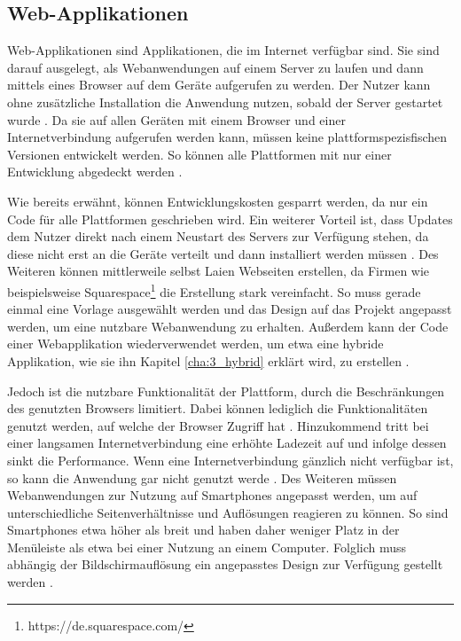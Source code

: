 \subsection{Web-Applikationen}
\label{cha:3_2_web}
Web-Applikationen sind Applikationen, die im Internet verfügbar sind. Sie sind darauf ausgelegt, als Webanwendungen auf einem Server zu laufen und dann mittels eines Browser auf dem Geräte aufgerufen zu werden. Der Nutzer kann ohne zusätzliche Installation die Anwendung nutzen, sobald der Server gestartet wurde \cite{IEEE_Khackouch_Al}.
Da sie auf allen Geräten mit einem Browser und einer Internetverbindung aufgerufen werden kann, müssen keine plattformspezisfischen Versionen entwickelt werden.
So können alle Plattformen mit nur einer Entwicklung abgedeckt werden \cite{IEEE_development_classes}.

Wie bereits erwähnt, können Entwicklungskosten gesparrt werden, da nur ein Code für alle Plattformen geschrieben wird. Ein weiterer Vorteil ist, dass Updates dem Nutzer direkt nach einem Neustart des Servers zur Verfügung stehen, da diese nicht erst an die Geräte verteilt und dann installiert werden müssen \cite{IEEE_Khackouch_Al}. Des Weiteren können mittlerweile selbst Laien Webseiten erstellen, da Firmen wie beispielsweise Squarespace\footnote{https://de.squarespace.com/} die Erstellung stark vereinfacht. So muss gerade einmal eine Vorlage ausgewählt werden und das Design auf das Projekt angepasst werden, um eine nutzbare Webanwendung zu erhalten. 
Außerdem kann der Code einer Webapplikation wiederverwendet werden, um etwa eine hybride Applikation, wie sie ihn Kapitel \ref{cha:3_hybrid} erklärt wird, zu erstellen \cite{IEEE_Khackouch_Al}. 

Jedoch ist die nutzbare Funktionalität der Plattform, durch die Beschränkungen des genutzten Browsers limitiert. Dabei können lediglich die Funktionalitäten genutzt werden, auf welche der Browser Zugriff hat \cite{Phyo}. Hinzukommend tritt bei einer langsamen Internetverbindung eine erhöhte Ladezeit auf und infolge dessen sinkt die Performance. Wenn eine Internetverbindung gänzlich nicht verfügbar ist, so kann die Anwendung gar nicht genutzt werde \cite{IEEE_Khackouch_Al}. Des Weiteren müssen Webanwendungen zur Nutzung auf Smartphones angepasst werden, um auf unterschiedliche Seitenverhältnisse und Auflösungen reagieren zu können. So sind Smartphones etwa höher als breit und haben daher weniger Platz in der Menüleiste als etwa bei einer Nutzung an einem Computer. Folglich muss abhängig der Bildschirmauflösung ein angepasstes Design zur Verfügung gestellt werden \cite{Serrano_mobile}.

